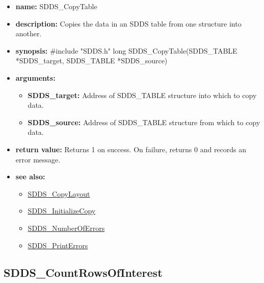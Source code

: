 \documentclass[11pt]{article}
\newcommand{\progref}[1]{\hyperref{SDDS_#1}{{\tt SDDS\_#1} (}{)}{SDDS_#1}}
\begin{document}
\begin{itemize}
\item {\bf name:}\newline
SDDS\_CopyTable
\item {\bf description:}\newline
Copies the data in an SDDS table from one structure into another.
\item {\bf synopsis:} \#include "SDDS.h"\newline
long SDDS\_CopyTable(SDDS\_TABLE *SDDS\_target, SDDS\_TABLE *SDDS\_source)
\item {\bf arguments:}
\begin{itemize}
\item {\bf SDDS\_target:} Address of SDDS\_TABLE structure into which to copy data.
\item {\bf SDDS\_source:} Address of SDDS\_TABLE structure from which to copy data.
\end{itemize}
\item {\bf return value:}\newline
Returns 1 on success. On failure, returns 0 and records an error message.
\item {\bf see also:}
\begin{itemize}
\item \progref{CopyLayout}
\item \progref{InitializeCopy}
\item \progref{NumberOfErrors}
\item \progref{PrintErrors}
\end{itemize}
\end{itemize}

\subsection{SDDS\_CountRowsOfInterest}
\label{SDDS_CountRowsOfInterest}
\end{document}
